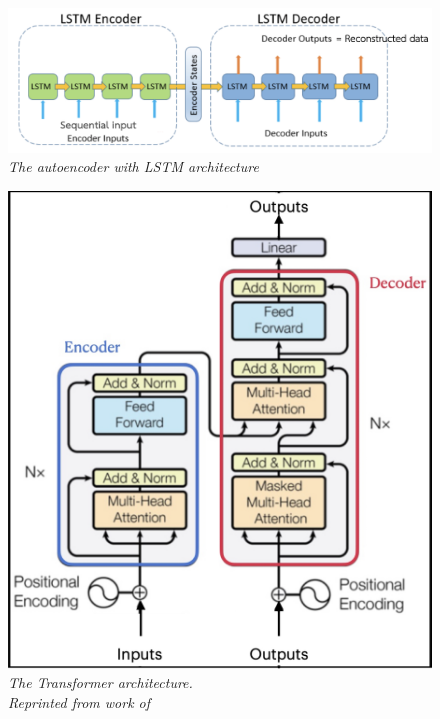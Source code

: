 \begin{figure}[H]
  \centering
  \caption[The autoencoder with LSTM architecture.]{\emph{The autoencoder with LSTM architecture}}\label{fig:LSTM_metho}
  \includegraphics[scale = 0.2]{figures/LSTM_metho.jpg}  
\end{figure}

\begin{figure}[H]
  \centering
  \caption[The Transformer architecture.]{\emph{The Transformer architecture. \\ Reprinted from work of \citeauthor{vaswani_shazeer_parmar_uszkoreit_jones_n_gomez_kaiser_polosukhin_2017} \citeyear{vaswani_shazeer_parmar_uszkoreit_jones_n_gomez_kaiser_polosukhin_2017}}}\label{fig:transformer_metho}
  \includegraphics[scale = 0.3]{figures/transformer_metho2.jpg}  
\end{figure}

